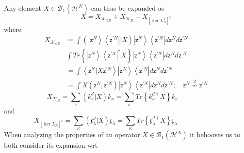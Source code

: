 \documentclass[aps,preprint]{revtex4}%
\begin{document}
Any element $X\in\mathcal{B}_{1}\left(  \mathcal{H}^{N}\right)  $ can thus be
expanded as
\begin{equation}
X=X_{\mathcal{K}_{OD}}+X_{\mathcal{K}_{D}}+X_{\left[  \ker L_{N}^{1}\right]
^{c}} \label{kerdec}%
\end{equation}
where
\begin{align}
X_{\mathcal{K}_{OD}}  &  =\int\left(  \left\vert \mathsf{z}^{N}\right\rangle
\left\langle \mathsf{z}^{\prime N}\right\vert |X\right)  \left\vert
\mathsf{z}^{N}\right\rangle \left\langle \mathsf{z}^{\prime N}\right\vert
d\mathsf{z}^{N}d\mathsf{z}^{\prime N}\nonumber\\
&  \int Tr\left\{  \left\vert \mathsf{z}^{N}\right\rangle \left\langle
\mathsf{z}^{\prime N}\right\vert ^{\dagger}X\right\}  \left\vert
\mathsf{z}^{N}\right\rangle \left\langle \mathsf{z}^{\prime N}\right\vert
d\mathsf{z}^{N}d\mathsf{z}^{\prime N}\nonumber\\
&  =\int\left\langle \mathsf{z}^{N}|X\mathsf{z}^{\prime N}\right\rangle
\left\vert \mathsf{z}^{N}\right\rangle \left\langle \mathsf{z}^{\prime
N}\right\vert d\mathsf{z}^{N}d\mathsf{z}^{\prime N}\nonumber\\
&  =\int X\left(  \mathsf{z}^{N},\mathsf{z}^{\prime N}\right)  \left\vert
\mathsf{z}^{N}\right\rangle \left\langle \mathsf{z}^{\prime N}\right\vert
d\mathsf{z}^{N}d\mathsf{z}^{\prime N};\quad\mathsf{z}^{N}\overset{2}{\nsim
}\mathsf{z}^{\prime N}%
\end{align}%
\begin{equation}
\qquad X_{\mathcal{K}_{D}}=%
{\displaystyle\sum\limits_{\kappa}}
\left(  k_{\kappa}^{d}|X\right)  k_{\kappa}=%
{\displaystyle\sum\limits_{\kappa}}
Tr\left\{  k_{\kappa}^{d\dagger}X\right\}  k_{\kappa}\qquad\qquad\qquad
\end{equation}
and
\begin{equation}
X_{\left[  \ker L_{N}^{1}\right]  ^{c}}=%
{\displaystyle\sum\limits_{\kappa}}
\left(  \mathfrak{x}_{\lambda}^{d}|X\right)  \mathfrak{x}_{\lambda}=%
{\displaystyle\sum\limits_{\kappa}}
Tr\left\{  \mathfrak{x}_{\lambda}^{d\dagger}X\right\}  \mathfrak{x}_{\lambda
}\qquad\qquad\qquad
\end{equation}
When analyzing the properties of an operator $X\in\mathcal{B}_{1}\left(
\mathcal{H}^{N}\right)  $ it behooves us to both consider its expansion wrt
\end{document}
